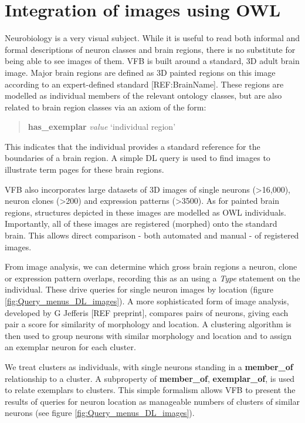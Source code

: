 \documentclass[runningheads,a4paper]{llncs}
\begin{document}
\section{Integration of images using OWL}

Neurobiology is a very visual subject.  While it is useful to read
both informal and formal descriptions of neuron classes and brain
regions, there is no substitute for being able to see images of them.
VFB is built around a standard, 3D adult brain image.  Major brain
regions are defined as 3D painted regions on this image according to
an expert-defined standard [REF:BrainName].  These regions are modelled as
individual members of the relevant ontology classes, but are also
related to brain region classes via an axiom of the form:

\begin{quote}
\textbf{has\_exemplar} \textit{value} `individual region'
\end{quote}

This indicates that the individual provides a standard reference for
the boundaries of a brain region.  A simple DL query is used to find
images to illustrate term pages for these brain regions.

VFB also incorporates large datasets of 3D images of single neurons
(\textgreater 16,000), neuron clones (\textgreater 200) and expression
patterns (\textgreater 3500). As for painted brain regions, structures
depicted in these images are modelled as OWL individuals.
Importantly, all of these images are registered (morphed) onto the
standard brain. This allows direct comparison - both automated and
manual  - of registered images. 

From image analysis, we can determine which gross brain regions a
neuron, clone or expression pattern overlaps, recording this as an
using a \textit{Type} statement on the individual.  These drive queries for
single neuron images by location (figure
\ref{fig:Query_menus_DL_images}). A more sophisticated form of image
analysis, developed by G Jefferis [REF preprint], compares pairs of 
neurons,  giving each pair a score for similarity of morphology and
location.  A clustering algorithm is then used to group neurons with
similar morphology and location and to assign an exemplar neuron for
each cluster.  

We treat clusters as individuals, with single neurons standing in a
\textbf{member\_of} relationship to a cluster.  A subproperty of
\textbf{member\_of}, \textbf{exemplar\_of}, is used to relate
exemplars to clusters.  This simple formalism allows VFB to present
the results of queries for neuron location as manageable numbers of
clusters of similar neurons (see figure \ref{fig:Query_menus_DL_images}).
\end{document}
